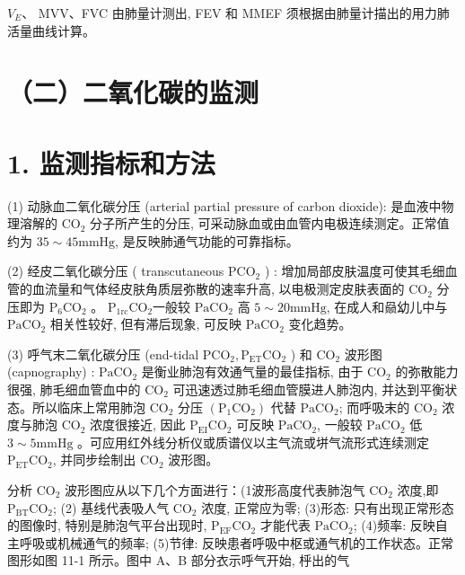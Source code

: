 \documentclass[10pt]{article}
\begin{document}
$V_{E} 、$ MVV、FVC 由肺量计测出, FEV 和 MMEF 须根据由肺量计描出的用力肺活量曲线计算。

\section*{（二）二氧化碳的监测}
\section*{1. 监测指标和方法}
(1) 动脉血二氧化碳分压 (arterial partial pressure of carbon dioxide): 是血液中物理溶解的 $\mathrm{CO}_{2}$ 分子所产生的分压, 可采动脉血或由血管内电极连续测定。正常值约为 $35 \sim 45 \mathrm{mmHg}$, 是反映肺通气功能的可靠指标。

(2) 经皮二氧化碳分压 ( transcutaneous $\mathrm{PCO}_{2}$ ) : 增加局部皮肤温度可使其毛细血管的血流量和气体经皮肤角质层弥散的速率升高, 以电极测定皮肤表面的 $\mathrm{CO}_{2}$ 分压即为 $\mathrm{P}_{6} \mathrm{CO}_{2}$ 。 $\mathrm{P}_{1 \mathrm{rc}} \mathrm{CO}_{2}$一般较 $\mathrm{PaCO}_{2}$ 高 $5 \sim 20 \mathrm{mmHg}$, 在成人和赑幼儿中与 $\mathrm{PaCO}_{2}$ 相关性较好, 但有滞后现象, 可反映 $\mathrm{PaCO}_{2}$ 变化趋势。

(3) 呼气末二氧化碳分压 (end-tidal $\mathrm{PCO}_{2}, \mathrm{P}_{\mathrm{ET}} \mathrm{CO}_{2}$ ) 和 $\mathrm{CO}_{2}$ 波形图 (capnography) : $\mathrm{PaCO}_{2}$ 是衡业肺泡有效通气量的最佳指标, 由于 $\mathrm{CO}_{2}$ 的弥散能力很强, 肺毛细血管血中的 $\mathrm{CO}_{2}$ 可迅速透过肺毛细血管膜进人肺泡内, 并达到平衡状态。所以临床上常用肺泡 $\mathrm{CO}_{2}$ 分压 $\left(\mathrm{P}_{1} \mathrm{CO}_{2}\right)$ 代替 $\mathrm{PaCO}_{2}$; 而呼吸末的 $\mathrm{CO}_{2}$ 浓度与肺泡 $\mathrm{CO}_{2}$ 浓度很接近, 因此 $\mathrm{P}_{\mathrm{EI}} \mathrm{CO}_{2}$ 可反映 $\mathrm{PaCO}_{2}$, 一般较 $\mathrm{PaCO}_{2}$ 低 $3 \sim 5 \mathrm{mmHg}$ 。可应用红外线分析仪或质谱仪以主气流或垪气流形式连续测定 $\mathrm{P}_{\mathrm{ET}} \mathrm{CO}_{2}$, 并同步绘制出 $\mathrm{CO}_{2}$ 波形图。

分析 $\mathrm{CO}_{2}$ 波形图应从以下几个方面进行：(1波形高度代表肺泡气 $\mathrm{CO}_{2}$ 浓度,即 $\mathrm{P}_{\mathrm{BT}} \mathrm{CO}_{2}$; (2) 基线代表吸人气 $\mathrm{CO}_{2}$ 浓度, 正常应为零; (3)形态: 只有出现正常形态的图像时, 特别是肺泡气平台出现时, $\mathrm{P}_{\mathrm{EF}} \mathrm{CO}_{2}$ 才能代表 $\mathrm{PaCO}_{2}$; (4)频率: 反映自主呼吸或机械通气的频率; (5)节律: 反映患者呼吸中枢或通气机的工作状态。正常图形如图 11-1 所示。图中 A、B 部分衣示呼气开始, 㭔出的气
\end{document}
